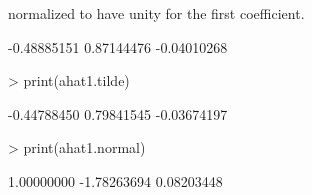 normalized to have unity for the first coefficient.
\begin{Schunk}
\begin{Soutput}
[1] -0.48885151  0.87144476 -0.04010268
\end{Soutput}
\begin{Sinput}
> print(ahat1.tilde)
\end{Sinput}
\begin{Soutput}
[1] -0.44788450  0.79841545 -0.03674197
\end{Soutput}
\begin{Sinput}
> print(ahat1.normal)
\end{Sinput}
\begin{Soutput}
[1]  1.00000000 -1.78263694  0.08203448
\end{Soutput}
\end{Schunk}

